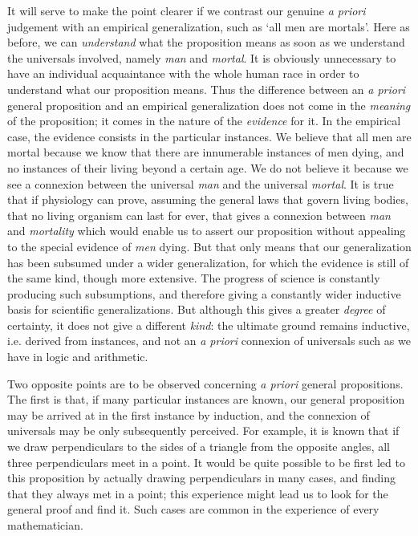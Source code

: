 \documentclass[oneside,letterpaper,12pt]{book}
\begin{document}
It will serve to make the point clearer if we contrast our genuine
\emph{a priori} judgement with an empirical generalization, such as
`all men are mortals'. \label{mortal} Here as before, we
can \emph{understand} what the proposition means as soon as we
understand the universals involved, namely \emph{man} and \emph{mortal}.
It is obviously unnecessary to have an individual acquaintance with the
whole human race in order to understand what our proposition means. Thus
the difference between an \emph{a priori} general proposition and an
empirical generalization does not come in the \emph{meaning} of the
proposition; it comes in the nature of the \emph{evidence} for it. In
the empirical case, the evidence consists in the particular instances.
We believe that all men are mortal because we know that there are
innumerable instances of men dying, and no instances of their living
beyond a certain age. We do not believe it because we see a connexion
between the universal \emph{man} and the universal \emph{mortal}. It is
true that if physiology can prove, assuming the general laws that govern
living bodies, that no living organism can last for ever, that gives a
connexion between \emph{man} and \emph{mortality} which would enable us
to assert our proposition without appealing to the special evidence of
\emph{men} dying. But that only means that our generalization has been
subsumed under a wider generalization, for which the evidence is still
of the same kind, though more extensive. The progress of science is
constantly producing such subsumptions, and therefore giving a
constantly wider inductive basis for scientific generalizations. But
although this gives a greater \emph{degree} of certainty, it does not
give a different \emph{kind}: the ultimate ground remains inductive,
i.e. derived from instances, and not an \emph{a priori} connexion of
universals such as we have in logic and arithmetic. \label{logic}

Two opposite points are to be observed concerning \emph{a priori}
general propositions. The first is that, if many particular instances
are known, our general proposition may be arrived at in the first
instance by induction, and the connexion of universals may be only
subsequently perceived. For example, it is known that if we draw
perpendiculars to the sides of a triangle from the opposite angles, all
three perpendiculars meet in a point. It would be quite possible to be
first led to this proposition by actually drawing perpendiculars in many
cases, and finding that they always met in a point; this experience
might lead us to look for the general proof and find it. Such cases are
common in the experience of every mathematician.
\end{document}
